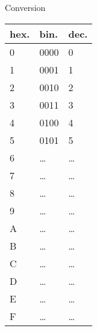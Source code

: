 \documentclass[10pt]{beamer}
\begin{document}
\begin{frame}
	\mframe{\Encodage}
	\begin{block}{Conversion}
		\renewcommand{\arraystretch}{0.8}
		\begin{center}
			\begin{tabularx}{0.4\textwidth}{|X|X|X|}
				\hline
				hex. & bin.  & dec.  \\
				\hline
				0    & 0000  & 0     \\
				1    & 0001  & 1     \\
				2    & 0010  & 2     \\
				3    & 0011  & 3     \\
				4    & 0100  & 4     \\
				5    & 0101  & 5     \\
				6    & \dots & \dots \\
				7    & \dots & \dots \\
				8    & \dots & \dots \\
				9    & \dots & \dots \\
				A    & \dots & \dots \\
				B    & \dots & \dots \\
				C    & \dots & \dots \\
				D    & \dots & \dots \\
				E    & \dots & \dots \\
				F    & \dots & \dots \\
				\hline
			\end{tabularx}
		\end{center}
	\end{block}
\end{frame}
\end{document}
